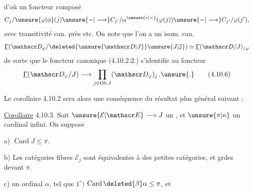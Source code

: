 d'où un foncteur composé
\[
 C_j/\unsure{\varphi|\phi}(j)\unsure{\mathbin{-}|\longrightarrow}
 C_{j'}/\alpha^{\unsure{*|\times}}(\varphi(j))\unsure{\mathbin{-}|\longrightarrow}
 C_{j'}/\varphi(j'),
\]
avec transitivité   can. près etc.
On note que l'on a un isom. can.
\[
 \underline{\Gamma}(\mathscr D_{\varphi}/\deleted{\unsure{\mathscr D|J}}\unsure{J|\mathbb J})\simeq
 \underline{\Gamma}(\mathscr D/J)_{/\varphi}
\]
de sorte que le foncteur  canonique (4.10.2.2.) s'identifie au foncteur
\[
 \underline{\Gamma}(\mathscr D_{\varphi}/J)\longrightarrow
 \prod_{j\in\operatorname{Ob}J}(\mathscr D_{\varphi})_j\,.\unsure{.} \tag*{(4.10.6)}
\]

Le corollaire 4.10.2 sera alors une conséquence du résultat plus général  suivant :

\uline{Corollaire} 4.10.3. Soit $\unsure{\mathcal E|\mathscr E}\longrightarrow J$ un   , et $\unsure{\pi|\kappa}$ un cardinal infini. On suppose 

a) $\operatorname{Card}J\leq\pi$.

b) Les catégories fibres $\mathcal E_j$ sont équivalentes à des petites catégories, et grdes devant $\pi$.

c)   un ordinal   $\alpha$, tel que $1^\circ)$  $\operatorname{Card}\deleted{\beta}\alpha\leq\pi$, et
